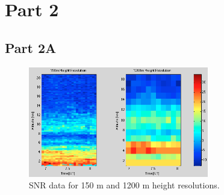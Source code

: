 \documentclass{article}
\begin{document}

\section{Part 2}


\subsection{Part 2A}

\begin{figure}[b!ht]
\centering
\includegraphics[width=0.7\textwidth]{Figures/height_res.png}
\caption{SNR data for 150 m and 1200 m height resolutions.}
\label{fig:height_res}
\end{figure}
\end{document}
